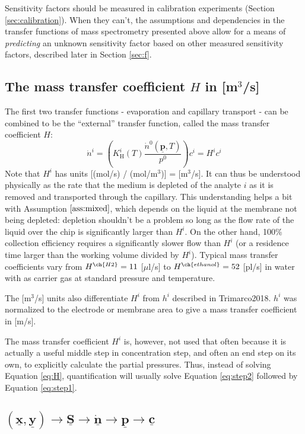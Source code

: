 \documentclass{article}
\renewcommand{\vec}[1]{\underline{\mathbf{#1}}}
\begin{document}
Sensitivity factors should be measured in calibration experiments (Section \ref{sec:calibration}). When they can't, the assumptions and dependencies in the transfer functions of mass spectrometry presented above allow for a means of \textit{predicting} an unknown sensitivity factor based on other measured sensitivity factors, described later in Section \ref{sec:f}.


\subsection{The mass transfer coefficient $H$ in [m$^3$/s] }\label{sec:H}

The first two transfer functions - evaporation and capillary transport - can be combined to be the ``external'' transfer function, called the mass transfer coefficient $H$:
\begin{equation}
\dot{n}^i = \left(
K_\text{H}^i(T)
\frac{\dot{n}^0(\vec{p}, T)}{p^0} 
\right) c^i = H^i c^i \label{eq:H}
\end{equation}
Note that $H^i$ has units [(mol/s) / (mol/m$^3$)] = [m$^3$/s]. It can thus be understood physically as the rate that the medium is depleted of the analyte $i$ as it is removed and transported through the capillary. This understanding helps a bit with Assumption $\ref{ass:mixed}$, which depends on the liquid at the membrane not being depleted: depletion shouldn't be a problem so long as the flow rate of the liquid over the chip is significantly larger than $H^i$. On the other hand, 100\% collection efficiency requires a significantly slower flow than $H^i$ (or a residence time larger than the working volume divided by $H^i$). Typical mass transfer coefficients vary from $H^{\ch{H2}}=11$ [$\mu$l/s] to $H^{\ch{ethanol}}=52$ [pl/s] in water with  as carrier gas at standard pressure and temperature.

The [m$^3$/s] units also differentiate $H^i$ from $h^i$ described in Trimarco2018. $h^i$ was normalized to the electrode or membrane area to give a mass transfer coefficient in [m/s].

The mass transfer coefficient $H^i$ is, however, not used that often because it is actually a useful middle step in concentration step, and often an end step on its own, to explicitly calculate the partial pressures. Thus, instead of solving Equation \ref{eq:H}, quantification will usually solve Equation \ref{eq:step2} followed by Equation \ref{eq:step1}.


\subsection{$(\vec{x}, \vec{y}) \rightarrow \vec{S} \rightarrow \vec{\dot{n}} \rightarrow \vec{p} \rightarrow \vec{c}$} \label{sec:solve}
\end{document}
